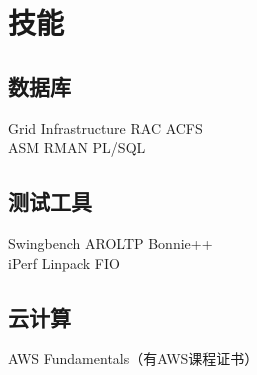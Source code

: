 \documentclass[]{deedy-resume-openfont}
\begin{document}
\begin{minipage}[t]{0.25\textwidth}



\section{技能}
\sectionsep
\subsection{数据库}
Grid Infrastructure \textbullet{} RAC \textbullet{} ACFS \\
ASM \textbullet{} RMAN \textbullet{} PL/SQL \textbullet{}  \\


\subsection{测试工具}
Swingbench \textbullet{} AROLTP \textbullet{} Bonnie++  \\
iPerf \textbullet{} Linpack \textbullet{} FIO  \\
\sectionsep

\subsection{云计算}
AWS Fundamentals（有AWS课程证书）

%
%

\end{minipage} 
\end{document}
